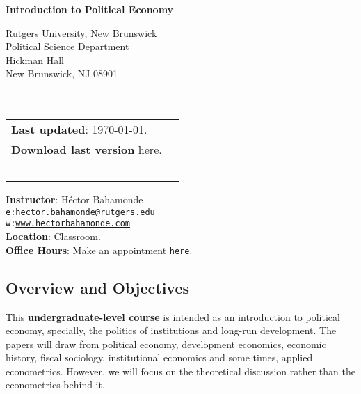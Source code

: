 \documentclass[letterpaper]{article}
\def\name{Introduction to Political Economy}
\begin{document}

\centerline{\huge \bf \name}

\vspace{0.25in}

\begin{minipage}{0.45\linewidth}
  Rutgers University, New Brunswick \\
  Political Science Department \\
  Hickman Hall \\
  New Brunswick, NJ 08901\\
  \\
  \\

\end{minipage}
\hspace{4cm}\begin{minipage}{0.45\linewidth}
  \begin{tabular}{ll}
{\bf Last updated}: \today. \\
 {\bf Download last version} \href{https://github.com/hbahamonde/Political-Economy-Intro-UGrad/raw/master/Pol_Econ_Dev_Syllabus_UGRAD.pdf}{here}.
    \\
    \\
    \\
    \\
    \\
    \\
  \end{tabular}
\end{minipage}

\vspace{-5mm}
{\bf Instructor}: H\'ector Bahamonde\\
\texttt{e:}\href{mailto:hector.bahamonde@rutgers.edu}{\texttt{hector.bahamonde@rutgers.edu}}\\
\texttt{w:}\href{http://www.hectorbahamonde.com}{\texttt{www.hectorbahamonde.com}}\\
{\bf Location}: Classroom.\\
{\bf Office Hours}: Make an appointment \href{https://calendly.com/bahamonde/officehours}{\texttt{here}}.

\subsection*{Overview and Objectives}

This {\bf {\color{blue}undergraduate-level course}} is intended as an introduction to political economy, specially, the politics of institutions and long-run development. The papers will draw from political economy, development economics, economic history, fiscal sociology, institutional economics and some times, applied econometrics. However, we will focus on the theoretical discussion rather than the econometrics behind it.
\end{document}
